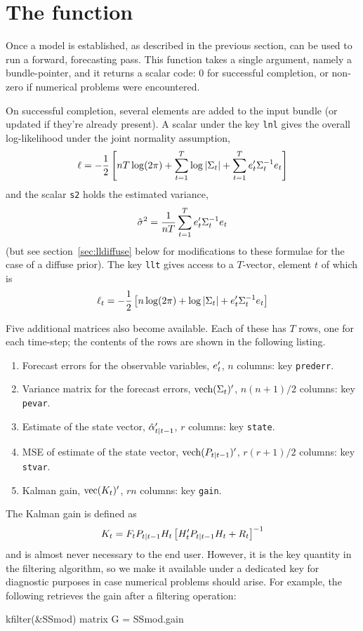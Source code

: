 \documentclass[a4paper]{article}
\begin{document}
\section{The  function}
\label{sec:kfilter}

Once a model is established, as described in the previous section,
 can be used to run a forward, forecasting pass.  This
function takes a single argument, namely a bundle-pointer, and it
returns a scalar code: 0 for successful completion, or non-zero if
numerical problems were encountered.

On successful completion, several elements are added to the input
bundle (or updated if they're already present).  A scalar under the
key \texttt{lnl} gives the overall log-likelihood under the joint
normality assumption,
%
\[
  \ell = -\frac{1}{2} \left[nT \log(2 \pi) + \sum_{t=1}^T\log \left|\Sigma_t\right| + 
    \sum_{t=1}^Te_t'\Sigma_t^{-1} e_t
  \right]
\]
%
and the scalar \texttt{s2} holds the estimated variance,
%
\[
\hat{\sigma}^2 = \frac{1}{nT} 
   \sum_{t=1}^Te_t'\Sigma_t^{-1} e_t
\]
(but see section~\ref{sec:lldiffuse} below for modifications to these
formulae for the case of a diffuse prior).  The key \texttt{llt} gives
access to a $T$-vector, element $t$ of which is
%
\[
  \ell_t = -\frac{1}{2} \left[n \log(2 \pi) + \log \left|\Sigma_t\right| + 
    e_t'\Sigma_t^{-1} e_t
  \right]
\]
%

Five additional matrices also become available.  Each of these has $T$
rows, one for each time-step; the contents of the rows are shown in
the following listing.
%
\begin{enumerate}
\item Forecast errors for the observable variables, $e_t'$, $n$
  columns: key \texttt{prederr}.
\item Variance matrix for the forecast errors, $\mbox{vech}(\Sigma_t)'$,
  $n(n+1)/2$ columns: key \texttt{pevar}.
\item Estimate of the state vector, $\hat{\alpha}_{t|t-1}'$, $r$
  columns: key \texttt{state}.
\item MSE of estimate of the state vector,
  $\mbox{vech}(P_{t|t-1})'$, $r(r+1)/2$ columns: key \texttt{stvar}.
\item Kalman gain, $\mbox{vec}(K_t)'$, $rn$ columns: key
  \texttt{gain}.
\end{enumerate}

The Kalman gain is defined as 
\[
K_t = F_t P_{t|t-1} H_t 
\left[H_t' P_{t|t-1} H_t + R_t\right]^{-1}
\]
and is almost never necessary to the end user. However, it is the key
quantity in the filtering algorithm, so we make it available under a
dedicated key for diagnostic purposes in case numerical problems
should arise. For example, the following retrieves the gain after a
filtering operation:
%
\begin{code}
kfilter(&SSmod)
matrix G = SSmod.gain
\end{code}
\end{document}
